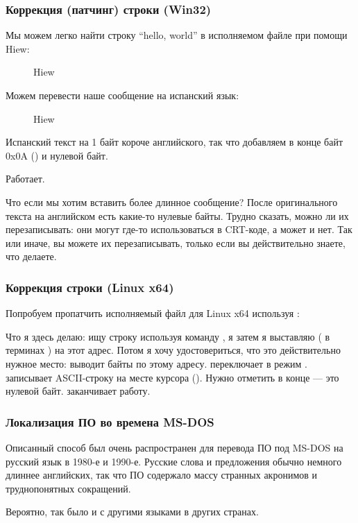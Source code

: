 \subsubsection{Коррекция (патчинг) строки (Win32)}

Мы можем легко найти строку ``hello, world'' в исполняемом файле при помощи Hiew:

\begin{figure}[H]
\centering
{}
\caption{Hiew}
\label{}
\end{figure}

Можем перевести наше сообщение на испанский язык:

\begin{figure}[H]
\centering
{}
\caption{Hiew}
\label{}
\end{figure}

Испанский текст на 1 байт короче английского, так что добавляем в конце байт 0x0A () и нулевой байт.

Работает.

Что если мы хотим вставить более длинное сообщение?
После оригинального текста на английском есть какие-то нулевые байты.
Трудно сказать, можно ли их перезаписывать: они могут где-то использоваться в \ac{CRT}-коде, а может и нет.
Так или иначе, вы можете их перезаписывать, только если вы действительно знаете, что делаете.

\subsubsection{Коррекция строки (Linux x64)}

\myindex{\radare}
Попробуем пропатчить исполняемый файл для Linux x64 используя \radare{}:



Что я здесь делаю: ищу строку  используя команду \TT{/}, 
я затем я выставляю  ( в терминах \radare{}) на этот адрес.
Потом я хочу удостовериться, что это действительно нужное место:  выводит байты по этому адресу.
 переключает \radare{} в режим .
 записывает ASCII-строку на месте курсора ().
Нужно отметить  в конце --- это нулевой байт.
 заканчивает работу.

\subsubsection{Локализация ПО во времена MS-DOS}

Описанный способ был очень распространен для перевода ПО под MS-DOS на русский язык в 1980-е и 1990-е.
Русские слова и предложения обычно немного длиннее английских, так что  ПО содержало
массу странных акронимов и труднопонятных сокращений.

Вероятно, так было и с другими языками в других странах.

